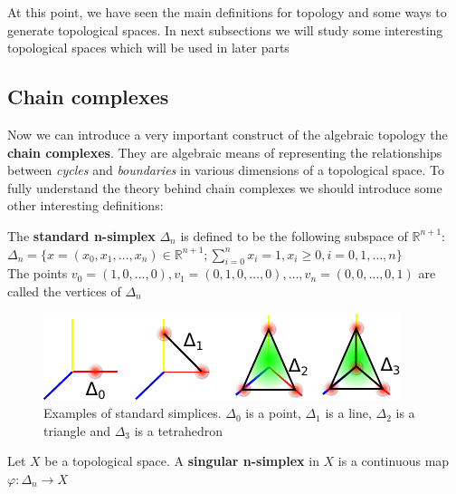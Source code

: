 At this point, we have seen the main definitions for topology and some ways to generate topological spaces. In next subsections we will study some interesting topological spaces which will be used in later parts

\subsection{Chain complexes}

Now we can introduce a very important construct of the algebraic topology the \textbf{chain complexes}. They are algebraic means of representing the relationships between \textit{cycles} and \textit{boundaries} in various dimensions of a topological space. To fully understand the theory behind chain complexes we should introduce some other interesting definitions:

\begin{definition}
 The \textbf{standard n-simplex} $\Delta_{n}$ is defined to be the following subspace of $\mathbb{R}^{n+1}$:\\
 $\Delta_{n} = \{ x=(x_{0},x_{1},\dots,x_{n}) \in \mathbb{R}^{n+1}; \displaystyle\sum_{i=0}^{n} x_{i} = 1, x_{i} \geq 0, i = 0,1,\dots,n \}$\\
 The points $v_{0} = (1,0,\dots,0), v_{1} = (0,1,0,\dots,0),\dots, v_{n} = (0,0,\dots,0,1)$ are called the vertices of $\Delta_{n}$
\end{definition}

\begin{figure}[htb] %
   \centering
   \includegraphics[width=0.80\linewidth]{images/standardSimplices.pdf}
   \caption[Examples of standard n-simplices]{Examples of standard simplices. $\Delta_{0}$ is a point, $\Delta_{1}$ is a line, $\Delta_{2}$ is a triangle and $\Delta_{3}$ is a tetrahedron}
   \label{fig:standardSimplex}
\end{figure}

\begin{definition}
 Let $X$ be a topological space. A \textbf{singular n-simplex} in $X$ is a continuous map $\varphi \colon \Delta_{n} \rightarrow X$
\end{definition}


